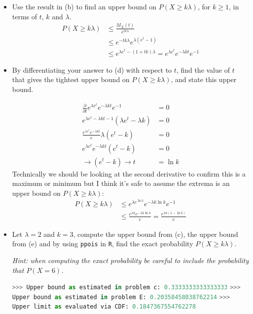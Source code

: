 \documentclass{article}
\newcommand{\1}{\mathbf{1}}
\begin{document}
\begin{itemize}
    \item[d.] Use the result in (b) to find an upper bound on $P(X \geq k\lambda)$, for $k\geq 1$, in terms of $t$, $k$ and $\lambda$.
    \begin{align*}
        P(X \geq k\lambda ) &\leq \frac{M_X(t)}{e^{tk\lambda}} \\
        &\leq e^{-tk\lambda} e^{\lambda(e^t-1)} \\
        &\leq e^{\lambda e^t-(1+tk)\lambda} = e^{\lambda e^t}e^{-\lambda kt}e^{-1}
    \end{align*}
    
    \newpage
    \item[e.] By differentiating your answer to {\color{blue}(d)} with respect to $t$, find the value of $t$ that gives the tightest upper bound on $P(X \geq k\lambda)$, and state this upper bound.
    
    \begin{align*}
        \frac{\partial}{\partial t} e^{\lambda e^t}e^{-\lambda kt}e^{-1} &= 0 \\
        e^{\lambda e^t - \lambda k t - 1}(\lambda e^t - \lambda k) &= 0 \\
        \frac{e^{\lambda e^t}e^{-\lambda kt}}{e} \lambda (e^t - k) &= 0 \\
        e^{\lambda e^t}e^{-\lambda kt} (e^t - k) &= 0 \\
        \rightarrow (e^t - k)  \rightarrow t &= \ln k
    \end{align*}
    Technically we should be looking at the second derivative to confirm this is a maximum or minimum but I think it's safe to assume the extrema is an upper bound on $P(X \geq k\lambda)$:
    \begin{align*}
        P(X \geq k\lambda) &\leq e^{\lambda e^{\ln k}}e^{-\lambda k\ln k}e^{-1} \\
        &\leq \frac{e^{\lambda k}e^{-\lambda k\ln k}}{e} = \frac{e^{\lambda k(1-\ln k)}}{e}
    \end{align*}
    
    \item[f.] Let $\lambda=2$ and $k=3$, compute the upper bound from (c), the upper bound from (e) and by using {\tt ppois} in {\tt R}, find the exact probability $P(X \geq k\lambda)$.\par
    {\it Hint: when computing the exact probability be careful to include the probability that $P(X=6)$.}
    
    
    \lstinline[language=Python]{>>> Upper bound as estimated in problem c: 0.3333333333333333} \newline
    \lstinline[language=Python]{>>> Upper bound as estimated in problem E: 0.20358458038762214} \newline
    \lstinline[language=Python]{>>> Upper limit as evaluated via CDF: 0.1847367554762278}\newline

\end{itemize}
\end{document}
